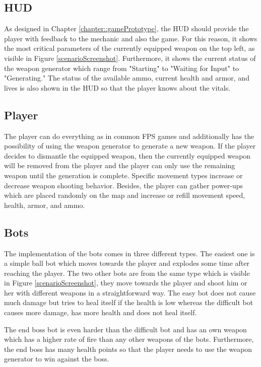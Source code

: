 \documentclass[MGS,Master,english]{twbook}%
\begin{document}
\subsection{\acl{HUD}}
As designed in Chapter \ref{chapter::gamePrototype}, the \ac{HUD} should provide the player with feedback to the mechanic and also the game. For this reason, it shows the most critical parameters of the currently equipped weapon on the top left, as visible in Figure \ref{scenarioScreenshot}. Furthermore, it shows the current status of the weapon generator which range from "Starting" to "Waiting for Input" to "Generating." The status of the available ammo, current health and armor, and lives is also shown in the \ac{HUD} so that the player knows about the vitals.

\subsection{Player}
The player can do everything as in common \ac{FPS} games and additionally has the possibility of using the weapon generator to generate a new weapon. If the player decides to dismantle the equipped weapon, then the currently equipped weapon will be removed from the player and the player can only use the remaining weapon until the generation is complete. Specific movement types increase or decrease weapon shooting behavior. Besides, the player can gather power-ups which are placed randomly on the map and increase or refill movement speed, health, armor, and ammo.

\subsection{Bots}
The implementation of the bots comes in three different types. The easiest one is a simple ball bot which moves towards the player and explodes some time after reaching the player. The two other bots are from the same type  which is visible in Figure \ref{scenarioScreenshot}, they move towards the player and shoot him or her with different weapons in a straightforward way. The easy bot does not cause much damage but tries to heal itself if the health is low whereas the difficult bot causes more damage, has more health and does not heal itself.

The end boss bot is even harder than the difficult bot and has an own weapon which has a higher rate of fire than any other weapons of the bots. Furthermore, the end boss has many health points so that the player needs to use the weapon generator to win against the boss.
\end{document}
